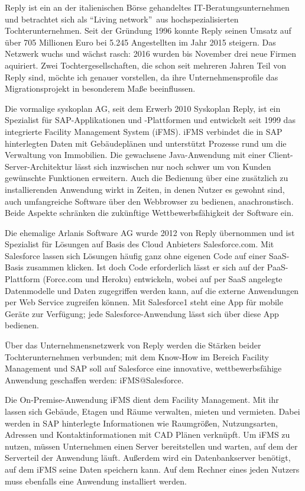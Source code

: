 

Reply ist ein an der italienischen Börse gehandeltes 
IT-Beratungsunternehmen und betrachtet sich als "`Living network"'\ aus 
hochspezialisierten Tochterunternehmen. Seit der Gründung 1996 konnte Reply 
seinen Umsatz auf über 705 Millionen Euro bei 5.245 Angestellten im Jahr 2015 
steigern. Das Netzwerk wuchs und wächst rasch: 2016 wurden bis November drei 
neue Firmen aquiriert. Zwei Tochtergesellschaften, die schon seit mehreren 
Jahren Teil von Reply sind, 
möchte ich genauer vorstellen, da ihre Unternehmensprofile das 
Migrationsprojekt in besonderem Maße beeinflussen.

Die vormalige syskoplan AG, seit dem Erwerb 2010  
Syskoplan Reply, ist ein Spezialist für SAP-Applikationen und 
-Plattformen  und entwickelt seit 1999 das 
integrierte Facility Management System (iFMS). iFMS verbindet die in SAP 
hinterlegten Daten mit Gebäudeplänen und unterstützt Prozesse rund um die 
Verwaltung von Immobilien. Die gewachsene 
Java-Anwendung mit einer Client-Server-Architektur lässt sich inzwischen nur 
noch schwer um von Kunden gewünschte Funktionen erweitern. Auch die Bedienung 
über 
eine zusätzlich zu installierenden Anwendung wirkt in Zeiten, in denen Nutzer 
es gewohnt sind, auch umfangreiche Software über den Webbrowser zu bedienen, 
anachronstisch. Beide Aspekte schränken die zukünftige
Wettbewerbsfähigkeit der Software ein. 

Die ehemalige Arlanis Software AG wurde 2012 von Reply übernommen und ist 
Spezialist für Lösungen auf Basis des Cloud Anbieters Salesforce.com. Mit 
Salesforce lassen sich Lösungen häufig ganz ohne eigenen Code auf einer 
SaaS-Basis zusammen klicken. Ist doch Code erforderlich lässt er sich auf der 
PaaS-Plattform (Force.com und Heroku) entwickeln, wobei auf per SaaS angelegte 
Datenmodelle und Daten zugegriffen werden kann, auf die externe Anwendungen per 
Web Service zugreifen können. Mit Salesforce1 steht eine App für mobile Geräte 
zur Verfügung; jede Salesforce-Anwendung lässt sich über diese App bedienen. 

Über das Unternehmensnetzwerk von Reply werden die Stärken beider 
Tochterunternehmen verbunden; mit dem Know-How im Bereich Facility 
Management und SAP soll auf Salesforce eine innovative, wettbewerbsfähige 
Anwendung geschaffen werden: iFMS@Salesforce.

Die On-Premise-Anwendung iFMS dient dem Facility Management. Mit ihr lassen 
sich Gebäude, Etagen und Räume verwalten, mieten und vermieten. Dabei werden in 
SAP hinterlegte Informationen wie Raumgrößen, Nutzungsarten, Adressen und 
Kontaktinformationen mit CAD Plänen verknüpft. Um iFMS zu nutzen, müssen 
Unternehmen einen Server bereitstellen und warten, auf dem der Serverteil der 
Anwendung läuft. Außerdem wird ein Datenbankserver benötigt, auf dem iFMS seine 
Daten speichern kann. Auf dem Rechner eines jeden Nutzers muss ebenfalls eine 
Anwendung installiert werden. 

